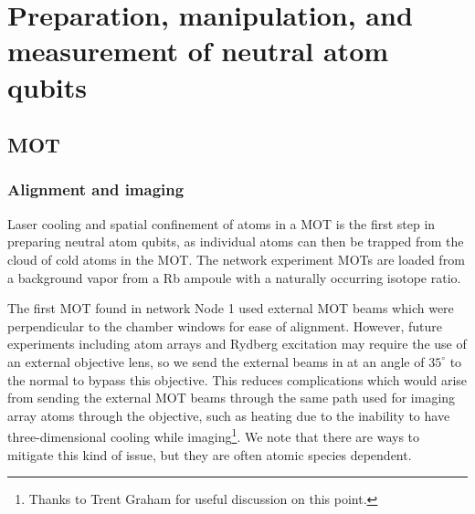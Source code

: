 \chapter{Preparation, manipulation, and measurement of neutral atom qubits}\label{ch:qubit_prep}

\section{MOT}
\subsection{Alignment and imaging}

Laser cooling and spatial confinement of atoms in a MOT is the first step in preparing neutral atom qubits, as individual atoms can then be trapped from the cloud of cold atoms in the MOT. The network experiment MOTs are loaded from a background vapor from a Rb ampoule with a naturally occurring isotope ratio.

The first MOT found in network Node 1 used external MOT beams which were perpendicular to the chamber windows for ease of alignment. However, future experiments including atom arrays and Rydberg excitation may require the use of an external objective lens, so we
send the external beams in at an angle of $35^{\circ}$ to the normal to bypass this objective. This reduces complications which would arise from sending the external MOT beams through the same path used for imaging array atoms through the objective, such as heating due to the inability to have three-dimensional cooling while imaging\footnote{Thanks to Trent Graham for useful discussion on this point.}. We note that there are ways to mitigate this kind of issue, but they are often atomic species dependent\cite{covey20192000}.

